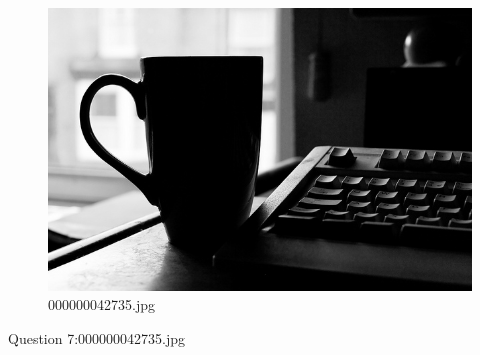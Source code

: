     \begin{figure}[h]
        \centering
        \includegraphics[width=0.8\linewidth]{../image set/easy/000000042735.jpg}
        \caption{000000042735.jpg}
    \end{figure}
    Question 7:000000042735.jpg
